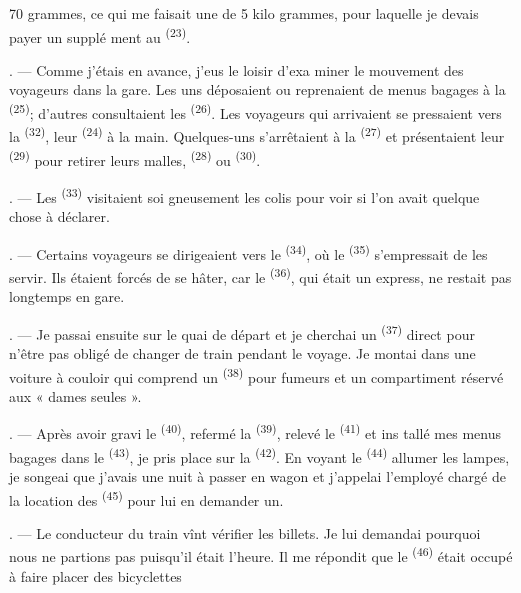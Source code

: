 \begin{VUpage}[72]{70}
\VUcontinue
grammes, ce qui me faisait une  de 5 kilo\cc
grammes, pour laquelle je devais payer un supplé\cc
ment au  \textsuperscript{(23)}.

. --- Comme j'étais en avance, j'eus le loisir d'exa\cc
miner le mouvement des voyageurs dans la gare. Les\nl
uns déposaient ou reprenaient de menus bagages à la\nl
{} \textsuperscript{(25)}; d'autres consultaient les  \textsuperscript{(26)}.\nl
Les voyageurs qui arrivaient se pressaient vers la\nl
{} \textsuperscript{(32)}, leur  \textsuperscript{(24)} à la main. Quelques-uns\nl
s'arrêtaient à la  \textsuperscript{(27)}\nl
et présentaient leur \textsuperscript{(29)} pour retirer leurs\nl
malles, \textsuperscript{(28)} ou \textsuperscript{(30)}.

. --- Les \textsuperscript{(33)} visitaient soi\cc
gneusement les colis pour voir si l'on avait quelque\nl
chose à déclarer.

. --- Certains voyageurs se dirigeaient vers le \cc
{}\textsuperscript{(34)}, où le \textsuperscript{(35)} s'empressait de les servir.\nl
Ils étaient forcés de se hâter, car le \textsuperscript{(36)}, qui\nl
était un express, ne restait pas longtemps en gare.

. --- Je passai ensuite sur le quai de départ et je\nl
cherchai un \textsuperscript{(37)} direct pour n'être pas obligé de\nl
changer de train pendant le voyage. Je montai dans\nl
une voiture à couloir qui comprend un \cc
{}\textsuperscript{(38)} pour fumeurs et un compartiment réservé\nl
aux « dames seules ».

. --- Après avoir gravi le \textsuperscript{(40)},\nl
refermé la \textsuperscript{(39)}, relevé le \textsuperscript{(41)} et ins\cc
tallé mes menus bagages dans le \textsuperscript{(43)}, je pris\nl
place sur la \textsuperscript{(42)}. En voyant le \textsuperscript{(44)}\nl
allumer les lampes, je songeai que j'avais une nuit à\nl
passer en wagon et j'appelai l'employé chargé de la\nl
location des \textsuperscript{(45)} pour lui en demander un.

. --- Le conducteur du train vînt vérifier les\nl
billets. Je lui demandai pourquoi nous ne partions pas\nl
puisqu'il était l'heure. Il me répondit que le \nl
{}\textsuperscript{(46)} était occupé à faire placer des bicyclettes
\parplein
\end{VUpage}

